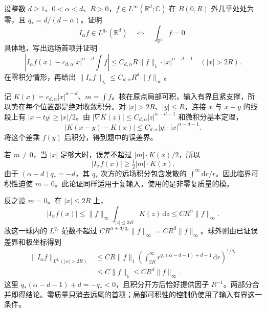 \begin{exercise}\label{b2:ex:19-new-2}
设整数 \(d\geq1\)、\(0<\alpha<d\)、\(R>0\)，\(f\in L^\infty(\mathbb R^d;\mathbb C)\) 在 \(B(0,R)\) 外几乎处处为零，且 \(q_*=d/(d-\alpha)\)。证明
\[
 I_\alpha f\in L^{q_*}(\mathbb R^d)
 \quad\Longleftrightarrow\quad \int_{\mathbb R^d}f=0.
\]
具体地，写出远场首项并证明
\[
 \left|I_\alpha f(x)
       -c_{d,\alpha}|x|^{\alpha-d}\int f\right|
 \leq C_{d,\alpha}R\|f\|_1\cdot|x|^{\alpha-d-1}
 \quad(|x|>2R).
\]
在零积分情形，再给出 \(\|I_\alpha f\|_{q_*}\leq C_{d,\alpha}R^d\|f\|_\infty\)。
\end{exercise}
\begin{solution}
记 \(K(x)=c_{d,\alpha}|x|^{\alpha-d}\)、\(m=\int f\)。核在原点局部可积，输入有界且紧支撑，所以势在每个位置都是绝对收敛积分。对 \(|x|>2R\)、\(|y|\leq R\)，连接 \(x\) 与 \(x-y\) 的线段上有 \(|x-ty|\geq|x|/2\)。由
\(|\nabla K(z)|\leq C_{d,\alpha}|z|^{\alpha-d-1}\) 和微积分基本定理，
\[
 |K(x-y)-K(x)|
 \leq C_{d,\alpha}|y|\cdot|x|^{\alpha-d-1}.
\]
将这个差乘 \(f(y)\) 后积分，得到题中的误差界。

若 \(m\ne0\)，当 \(|x|\) 足够大时，误差不超过 \(|m|\cdot K(x)/2\)，所以
\[
 |I_\alpha f(x)|\geq\tfrac12|m|\cdot K(x).
\]
由于 \((\alpha-d)q_*=-d\)，其 \(q_*\) 次方的远场积分包含发散的 \(\int^\infty\mathrm dr/r\)。因此临界可积性迫使 \(m=0\)。此论证同样适用于复输入，使用的是非零复质量的模。

反之设 \(m=0\)。在 \(|x|\leq2R\) 上，
\[
 |I_\alpha f(x)|
 \leq\|f\|_\infty\int_{|z|\leq3R}K(z)\,\mathrm dz
 \leq C R^\alpha\|f\|_\infty.
\]
故这一球内的 \(L^{q_*}\) 范数不超过
\(CR^{\alpha+d/q_*}\|f\|_\infty=CR^d\|f\|_\infty\)。球外则由已证误差界和极坐标得到
\[
 \begin{aligned}
 \|I_\alpha f\|_{L^{q_*}(|x|>2R)}
 &\leq CR\|f\|_1
  \left(\int_{2R}^\infty
       r^{q_*(\alpha-d-1)+d-1}\,\mathrm dr\right)^{1/q_*}\\
 &\leq C\|f\|_1
 \leq CR^d\|f\|_\infty.
 \end{aligned}
\]
这里 \(q_*(\alpha-d-1)+d=-q_*<0\)，且积分开方后恰好提供因子 \(R^{-1}\)。两部分合并即得结论。零质量只消去远尾的首项；局部可积性的控制仍使用了输入有界这一条件。
\end{solution}

